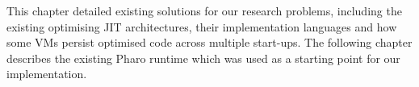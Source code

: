 \documentclass[a4paper,12pt,twoside]{../includes/ThesisStyle}
\begin{document}
This chapter detailed existing solutions for our research problems, including the existing optimising JIT architectures, their implementation languages and how some VMs persist optimised code across multiple start-ups. The following chapter describes the existing Pharo runtime which was used as a starting point for our implementation.








\end{document}
